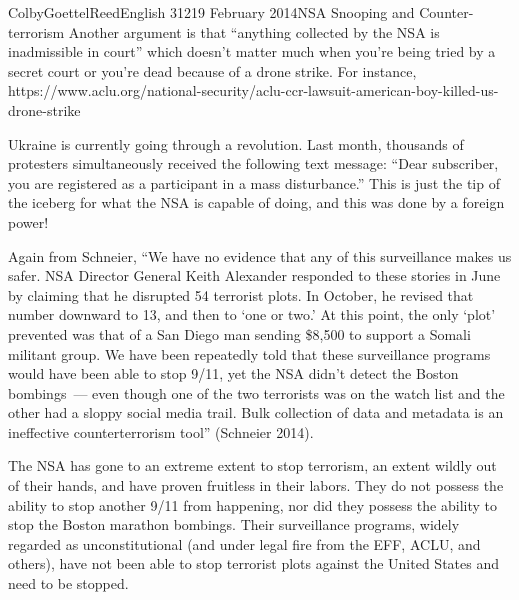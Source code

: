 \documentclass[12pt]{article}
\begin{document}
\begin{mla}{Colby}{Goettel}{Reed}{English 312}{19 February 2014}{NSA Snooping and Counter-terrorism}
Another argument is that ``anything collected by the NSA is inadmissible in court'' which doesn't matter much when you're being tried by a secret court or you're dead because of a drone strike. For instance, https://www.aclu.org/national-security/aclu-ccr-lawsuit-american-boy-killed-us-drone-strike

Ukraine is currently going through a revolution. Last month, thousands of protesters simultaneously received the following text message: ``Dear subscriber, you are registered as a participant in a mass disturbance.'' This is just the tip of the iceberg for what the NSA is capable of doing, and this was done by a foreign power!

Again from Schneier, ``We have no evidence that any of this surveillance makes us safer. NSA Director General Keith Alexander responded to these stories in June by claiming that he disrupted 54 terrorist plots. In October, he revised that number downward to 13, and then to `one or two.' At this point, the only `plot' prevented was that of a San Diego man sending \$8,500 to support a Somali militant group. We have been repeatedly told that these surveillance programs would have been able to stop 9/11, yet the NSA didn't detect the Boston bombings~--- even though one of the two terrorists was on the watch list and the other had a sloppy social media trail. Bulk collection of data and metadata is an ineffective counterterrorism tool'' (Schneier 2014).

The NSA has gone to an extreme extent to stop terrorism, an extent wildly out of their hands, and have proven fruitless in their labors. They do not possess the ability to stop another 9/11 from happening, nor did they possess the ability to stop the Boston marathon bombings. Their surveillance programs, widely regarded as unconstitutional (and under legal fire from the EFF, ACLU, and others), have not been able to stop terrorist plots against the United States and need to be stopped.


\end{mla}
\end{document}
